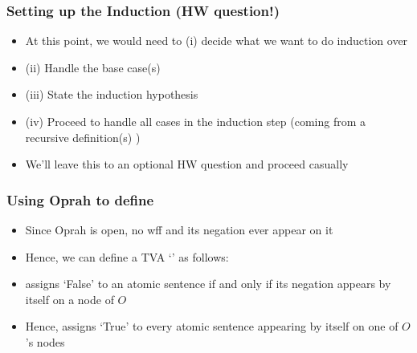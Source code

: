 \begin{frame}
\frametitle{Setting up the Induction (HW question!)}

\begin{itemize}[<+->]

\item At this point, we would need to (i) decide what we want to do induction over

\item (ii) Handle the base case(s)

\item (iii) State the induction hypothesis

\item (iv) Proceed to handle all cases in the induction step (coming from a recursive definition(s) ) 

\item We'll leave this to an optional HW question and proceed casually %

\end{itemize}
\end{frame}


\begin{frame}
\frametitle{Using Oprah to define }

\begin{itemize}[<+->]

\item Since Oprah is open, no wff and its negation ever appear on it

\item Hence, we can define a TVA `' as follows:

\bigskip

\bi
\item {} assigns `False' to an atomic sentence if and only if its negation appears by itself on a node of $O$

\item Hence,  assigns `True' to every atomic sentence appearing by itself on one of $O$'s nodes
\ei

\end{itemize}
\end{frame}

